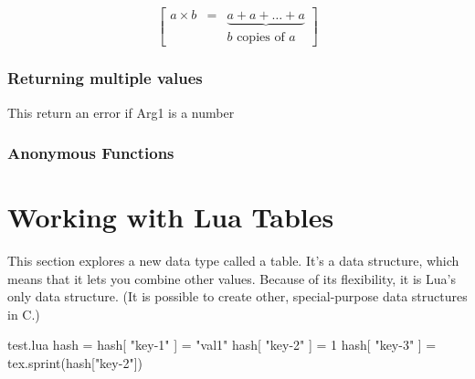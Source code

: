 \[
\begin{bmatrix}
   a\times b & = & \underbrace{a+a+\dots+a} \\
   & & b\mbox{ copies of }a
\end{bmatrix} 
\]


\begin{tcblisting}{}
\end{tcblisting}


\subsection{Returning multiple values}

This return an error if Arg1 is a number
\begin{tcblisting}{}
\end{tcblisting}


\begin{tcblisting}{}
\end{tcblisting}

\subsection{Anonymous Functions}
\begin{tcblisting}{}
\end{tcblisting}

\chapter{Working with Lua Tables}

This section explores a new data type called a table. It's a data structure, which means that it lets
you combine other values. Because of its flexibility, it is Lua’s only data structure. (It is possible to
create other, special-purpose data structures in C.)
\begin{tcblisting}{}
\begin{filecontents*}{test.lua}
hash = {}
hash[ "key-1" ] = "val1"
hash[ "key-2" ] = 1
hash[ "key-3" ] = {}
tex.sprint(hash["key-2"])
\end{filecontents*}
\end{tcblisting}


